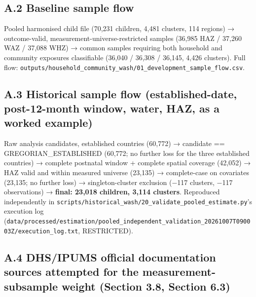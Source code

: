 \subsection*{A.2 Baseline sample flow}

Pooled harmonised child file (70,231 children, 4,481 clusters, 114 regions) → outcome-valid, measurement-universe-restricted samples (36,985 HAZ / 37,260 WAZ / 37,088 WHZ) → common samples requiring both household and community exposures classifiable (36,040 / 36,308 / 36,145, 4,426 clusters). Full flow: \texttt{outputs/household\_community\_wash/01\_development\_sample\_flow.csv}.

\subsection*{A.3 Historical sample flow (established-date, post-12-month window, water, HAZ, as a worked example)}

Raw analysis candidates, established countries (60,772) → candidate == GREGORIAN\_ESTABLISHED (60,772; no further loss for the three established countries) → complete postnatal window + complete spatial coverage (42,052) → HAZ valid and within measured universe (23,135) → complete-case on covariates (23,135; no further loss) → singleton-cluster exclusion (−117 clusters, −117 observations) → \textbf{final: 23,018 children, 3,114 clusters}. Reproduced independently in \texttt{scripts/historical\_wash/20\_validate\_pooled\_estimate.py}'s execution log (\texttt{data/processed/estimation/pooled\_independent\_validation\_20261007T090003Z/execution\_log.txt}, RESTRICTED).

\subsection*{A.4 DHS/IPUMS official documentation sources attempted for the measurement-subsample weight (Section 3.8, Section 6.3)}

